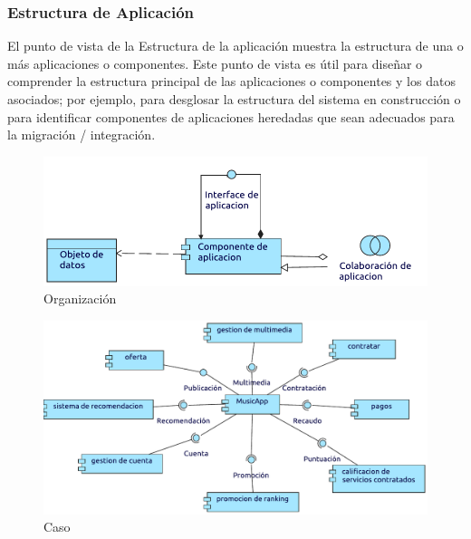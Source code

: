 \newpage

\subsubsection{Estructura de Aplicación}
El punto de vista de la Estructura de la aplicación muestra la estructura de una o más aplicaciones o componentes. Este punto de vista es útil para diseñar o comprender la estructura principal de las aplicaciones o componentes y los datos asociados; por ejemplo, para desglosar la estructura del sistema en construcción o para identificar componentes de aplicaciones heredadas que sean adecuados para la migración / integración.
\begin{figure}[h!]
	\centering
	\includegraphics[width=\linewidth]{Desarrollo/ArquitecturaEmpresarial/Aplicacion/imgs/estructuraMetamodelo.pdf}
	\caption{Organización}
\end{figure}
\newpage
{}

\begin{figure}[h!]
	\centering
	\includegraphics[width=\linewidth]{Desarrollo/ArquitecturaEmpresarial/Aplicacion/imgs/estructura.pdf}
	\caption{Caso}
\end{figure}











\newpage

